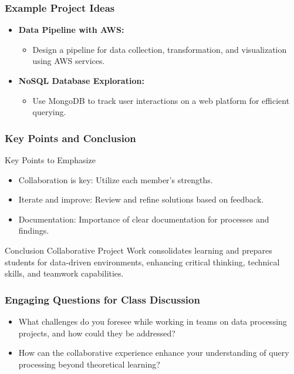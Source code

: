 \documentclass[aspectratio=169]{beamer}
\begin{document}
\begin{frame}[fragile]
    \frametitle{Example Project Ideas}

    \begin{itemize}
        \item \textbf{Data Pipeline with AWS:} 
            \begin{itemize}
                \item Design a pipeline for data collection, transformation, and visualization using AWS services.
            \end{itemize}
        \item \textbf{NoSQL Database Exploration:}
            \begin{itemize}
                \item Use MongoDB to track user interactions on a web platform for efficient querying.
            \end{itemize}
    \end{itemize}
\end{frame}

\begin{frame}[fragile]
    \frametitle{Key Points and Conclusion}

    \begin{block}{Key Points to Emphasize}
        \begin{itemize}
            \item Collaboration is key: Utilize each member's strengths.
            \item Iterate and improve: Review and refine solutions based on feedback.
            \item Documentation: Importance of clear documentation for processes and findings.
        \end{itemize}
    \end{block}
    
    \begin{block}{Conclusion}
        Collaborative Project Work consolidates learning and prepares students for data-driven environments, enhancing critical thinking, technical skills, and teamwork capabilities.
    \end{block}
\end{frame}

\begin{frame}[fragile]
    \frametitle{Engaging Questions for Class Discussion}

    \begin{itemize}
        \item What challenges do you foresee while working in teams on data processing projects, and how could they be addressed?
        \item How can the collaborative experience enhance your understanding of query processing beyond theoretical learning?
    \end{itemize}
\end{frame}
\end{document}
